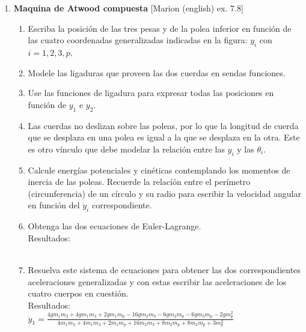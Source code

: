 \documentclass[11pt, spanish, a4paper, twoside]{article}
\begin{document}
\begin{enumerate}
	\item
	\begin{minipage}[t][10cm]{0.67\textwidth}
		\textbf{Maquina de Atwood compuesta} [Marion (english) ex. 7.8]\\ 
		\begin{enumerate}
			\item Escriba la posición de las tres pesas y de la polea inferior en función de 
			las cuatro coordenadas generalizadas indicadas en la figura: \(y_i\) con \(i = 1,2,3,p\). 
			\item Modele las ligaduras que proveen las dos cuerdas en sendas funciones.
			\item Use las funciones de ligadura para expresar todas las posiciones en función de \(y_1\) e \(y_2\).
			\item Las cuerdas no deslizan sobre las poleas, por lo que la longitud de cuerda que se desplaza en una polea es igual a la que se desplaza en la otra.
			Este es otro vínculo que debe modelar la relación entre las \(y_i\) y las \(\theta_i\).  
			\item Calcule energías potenciales y cinéticas contemplando los momentos de inercia de las poleas.
			Recuerde la relacíón entre el perímetro (circunferencia) de un círculo y su radio para escribir la velocidad angular en función del \(\dot{y}_i\) correspondiente.
			\item Obtenga las dos ecuaciones de Euler-Lagrange.\\
			Resultados:\\
			\\
			\item Resuelva este sistema de ecuaciones para obtener las dos correspondientes aceleraciones generalizadas y con estas escribir las aceleraciones de los cuatro cuerpos en cuestión.\\
			Resultados:\\
			$\ddot{y}_{1} = \frac{4 g m_{1} m_{2} + 4 g m_{1} m_{3} + 2 g m_{1} m_{p} - 16 g m_{2} m_{3} - 6 g m_{2} m_{p} - 6 g m_{3} m_{p} - 2 g m_{p}^{2}}{4 m_{1} m_{2} + 4 m_{1} m_{3} + 2 m_{1} m_{p} + 16 m_{2} m_{3} + 8 m_{2} m_{p} + 8 m_{3} m_{p} + 3 m_{p}^{2}}$\\

\end{enumerate}
\end{minipage}
\end{enumerate}
\end{document}
